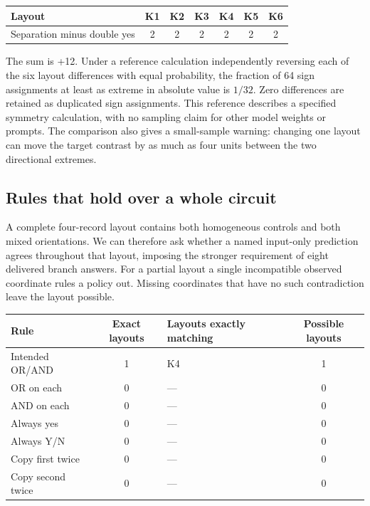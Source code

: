 \documentclass[12pt,letterpaper]{article}
\begin{document}
\begin{center}{\small\setlength{\tabcolsep}{4pt}\begin{tabularx}{\linewidth}{@{}Ycccccc@{}}\toprule
Layout & K1 & K2 & K3 & K4 & K5 & K6\\\midrule
Separation minus double yes & 2 & 2 & 2 & 2 & 2 & 2\\
\bottomrule\end{tabularx}}\end{center}

The sum is +12. Under a reference calculation independently reversing each of the six layout differences with equal probability, the fraction of 64 sign assignments at least as extreme in absolute value is $1/32$. Zero differences are retained as duplicated sign assignments. This reference describes a specified symmetry calculation, with no sampling claim for other model weights or prompts. The comparison also gives a small-sample warning: changing one layout can move the target contrast by as much as four units between the two directional extremes.

\subsection{Rules that hold over a whole circuit}

A complete four-record layout contains both homogeneous controls and both mixed orientations. We can therefore ask whether a named input-only prediction agrees throughout that layout, imposing the stronger requirement of eight delivered branch answers. For a partial layout a single incompatible observed coordinate rules a policy out. Missing coordinates that have no such contradiction leave the layout possible.

\begin{center}{\small\setlength{\tabcolsep}{4pt}\begin{tabularx}{\linewidth}{@{}YcYc@{}}\toprule
Rule & Exact layouts & Layouts exactly matching & Possible layouts\\\midrule
Intended OR/AND & 1 & K4 & 1\\
OR on each & 0 & --- & 0\\
AND on each & 0 & --- & 0\\
Always yes & 0 & --- & 0\\
Always Y/N & 0 & --- & 0\\
Copy first twice & 0 & --- & 0\\
Copy second twice & 0 & --- & 0\\
\bottomrule\end{tabularx}}\end{center}
\end{document}
